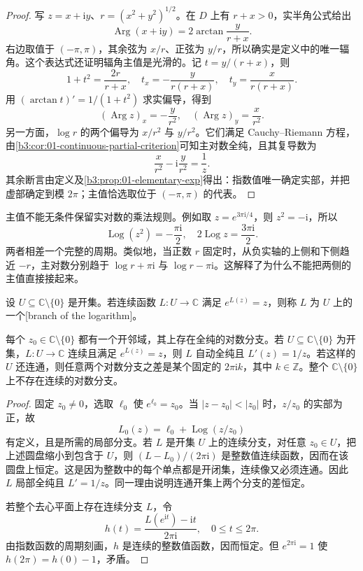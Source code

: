\begin{proof}
写 \(z=x+\mathrm{i}y\)、\(r=(x^2+y^2)^{1/2}\)。在 \(D\) 上有 \(r+x>0\)，实半角公式给出
\[
\operatorname{Arg}(x+\mathrm{i}y)
=2\arctan\frac{y}{r+x}.
\]
右边取值于 \((-\pi,\pi)\)，其余弦为 \(x/r\)、正弦为 \(y/r\)，所以确实是定义中的唯一辐角。这个表达式还证明辐角主值是光滑的。记 \(t=y/(r+x)\)，则
\[
 1+t^2=\frac{2r}{r+x},
 \quad t_x=-\frac{y}{r(r+x)},
 \quad t_y=\frac{x}{r(r+x)}.
\]
用 \((\arctan t)'=1/(1+t^2)\) 求实偏导，得到
\[
(\operatorname{Arg}z)_x=-\frac{y}{r^2},
\quad (\operatorname{Arg}z)_y=\frac{x}{r^2}.
\]
另一方面，\(\log r\) 的两个偏导为 \(x/r^2\) 与 \(y/r^2\)。它们满足 Cauchy--Riemann 方程，由\cref{b3:cor:01-continuous-partial-criterion}可知主对数全纯，且其复导数为
\[
\frac{x}{r^2}-\mathrm{i}\frac{y}{r^2}=\frac1z.
\]
其余断言由定义及\cref{b3:prop:01-elementary-exp}得出：指数值唯一确定实部，并把虚部确定到模 \(2\pi\)；主值恰选取位于 \((-\pi,\pi)\) 的代表。
\end{proof}

主值不能无条件保留实对数的乘法规则。例如取 \(z=e^{3\pi\mathrm{i}/4}\)，则 \(z^2=-\mathrm{i}\)，所以
\[
\operatorname{Log}(z^2)=-\frac{\pi\mathrm{i}}2,
\quad 2\operatorname{Log}z=\frac{3\pi\mathrm{i}}2.
\]
两者相差一个完整的周期。类似地，当正数 \(r\) 固定时，从负实轴的上侧和下侧趋近 \(-r\)，主对数分别趋于 \(\log r+\pi\mathrm{i}\) 与 \(\log r-\pi\mathrm{i}\)。这解释了为什么不能把两侧的主值直接接起来。

\begin{definition}
\label{b3:def:01-elementary-log-branch}
设 \(U\subseteq\mathbb C\setminus\{0\}\) 是开集。若连续函数 \(L\colon U\rightarrow\mathbb C\) 满足 \(e^{L(z)}=z\)，则称 \(L\) 为 \(U\) 上的一个[branch of the logarithm]。
\end{definition}

\begin{proposition}
\label{b3:prop:01-elementary-local-log}
每个 \(z_0\in\mathbb C\setminus\{0\}\) 都有一个开邻域，其上存在全纯的对数分支。若 \(U\subseteq\mathbb C\setminus\{0\}\) 为开集，\(L:U\to\mathbb C\) 连续且满足 \(e^{L(z)}=z\)，则 \(L\) 自动全纯且 \(L'(z)=1/z\)。若这样的 \(U\) 还连通，则任意两个对数分支之差是某个固定的 \(2\pi\mathrm{i}k\)，其中 \(k\in\mathbb Z\)。整个 \(\mathbb C\setminus\{0\}\) 上不存在连续的对数分支。
\end{proposition}

\begin{proof}
固定 \(z_0\neq0\)，选取 \(\ell_0\) 使 \(e^{\ell_0}=z_0\)。当 \(|z-z_0|<|z_0|\) 时，\(z/z_0\) 的实部为正，故
\[
L_0(z)=\ell_0+\operatorname{Log}(z/z_0)
\]
有定义，且是所需的局部分支。若 \(L\) 是开集 \(U\) 上的连续分支，对任意 \(z_0\in U\)，把上述圆盘缩小到包含于 \(U\)，则 \((L-L_0)/(2\pi\mathrm{i})\) 是整数值连续函数，因而在该圆盘上恒定。这是因为整数中的每个单点都是开闭集，连续像又必须连通。因此 \(L\) 局部全纯且 \(L'=1/z\)。同一理由说明连通开集上两个分支的差恒定。

若整个去心平面上存在连续分支 \(L\)，令
\[
h(t)=\frac{L(e^{\mathrm{i}t})-\mathrm{i}t}{2\pi\mathrm{i}},
\quad 0\leq t\leq2\pi.
\]
由指数函数的周期刻画，\(h\) 是连续的整数值函数，因而恒定。但 \(e^{2\pi\mathrm{i}}=1\) 使 \(h(2\pi)=h(0)-1\)，矛盾。
\end{proof}

